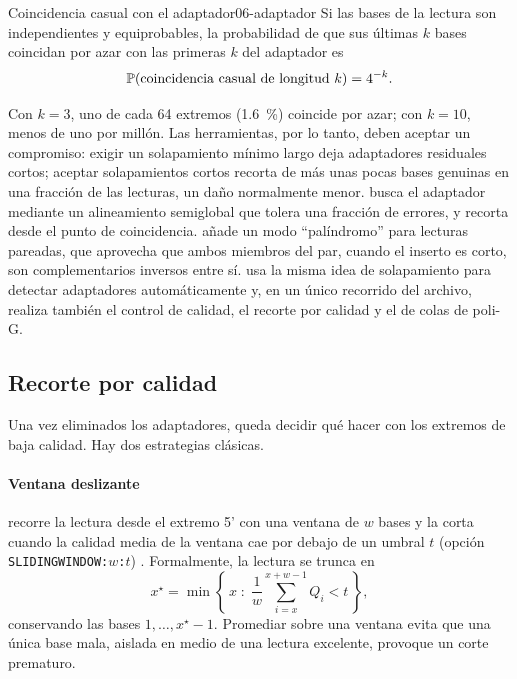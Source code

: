 \begin{definicion}{Coincidencia casual con el adaptador}{06-adaptador}
Si las bases de la lectura son independientes y equiprobables, la probabilidad de que sus últimas $k$ bases coincidan por azar con las primeras $k$ del adaptador es
\begin{equation}\label{eq:06-adaptador}
\mathbb{P}(\text{coincidencia casual de longitud } k) = 4^{-k}.
\end{equation}
\end{definicion}

\begin{simbolos}
\end{simbolos}

Con $k=3$, uno de cada 64 extremos (\SI{1,6}{\percent}) coincide por azar; con $k=10$, menos de uno por millón. Las herramientas, por lo tanto, deben aceptar un compromiso: exigir un solapamiento mínimo largo deja adaptadores residuales cortos; aceptar solapamientos cortos recorta de más unas pocas bases genuinas en una fracción de las lecturas, un daño normalmente menor.  \parencite{c06-martin2011} busca el adaptador mediante un alineamiento semiglobal que tolera una fracción de errores, y recorta desde el punto de coincidencia.  \parencite{c06-bolger2014} añade un modo ``palíndromo'' para lecturas pareadas, que aprovecha que ambos miembros del par, cuando el inserto es corto, son complementarios inversos entre sí.  \parencite{c06-chen2018} usa la misma idea de solapamiento para detectar adaptadores automáticamente y, en un único recorrido del archivo, realiza también el control de calidad, el recorte por calidad y el de colas de poli-G.

\subsection{Recorte por calidad}

Una vez eliminados los adaptadores, queda decidir qué hacer con los extremos de baja calidad. Hay dos estrategias clásicas.

\paragraph{Ventana deslizante}  recorre la lectura desde el extremo 5' con una ventana de $w$ bases y la corta cuando la calidad media de la ventana cae por debajo de un umbral $t$ (opción \texttt{SLIDINGWINDOW:$w$:$t$}) \parencite{c06-bolger2014}. Formalmente, la lectura se trunca en
\begin{equation}\label{eq:06-ventana}
x^{\star} = \min\left\{\,x \;:\; \frac{1}{w}\sum_{i=x}^{x+w-1} Q_i < t\,\right\},
\end{equation}
conservando las bases $1,\dots,x^{\star}-1$. Promediar sobre una ventana evita que una única base mala, aislada en medio de una lectura excelente, provoque un corte prematuro.

